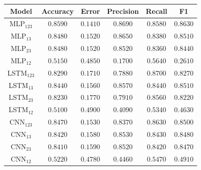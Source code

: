 \documentclass[a4paper,fleqn]{cas-sc}
\begin{document}
\begin{minipage}{0.45\textwidth}
	\vspace{0.5cm}
	\begingroup
	\begin{tiny}	
		\setlength{\tabcolsep}{3pt}
		\renewcommand{\arraystretch}{1.15}
		
		
		\begin{tabular*}{\textwidth}{@{} CCCCCC@{} }
			\toprule
			Model&Accuracy&Error&Precision&Recall&F1 \\
			\midrule
				MLP$_{123}$ & $0.8590$ & $0.1410$ & $0.8690$ & $0.8580$ & $0.8630$ \\
				MLP$_{13}$ & $0.8480$ & $0.1520$ & $0.8650$ & $0.8380$ & $0.8510$ \\
				MLP$_{23}$ & $0.8480$ & $0.1520$ & $0.8520$ & $0.8360$ & $0.8440$ \\
				MLP$_{12}$ & $0.5150$ & $0.4850$ & $0.1700$ & $0.5640$ & $0.2610$ \\
				LSTM$_{123}$ & $0.8290$ & $0.1710$ & $0.7880$ & $0.8700$ & $0.8270$ \\
				LSTM$_{13}$ & $0.8440$ & $0.1560$ & $0.8570$ & $0.8440$ & $0.8510$ \\
				LSTM$_{23}$ & $0.8230$ & $0.1770$ & $0.7910$ & $0.8560$ & $0.8220$ \\
				LSTM$_{12}$ & $0.5100$ & $0.4900$ & $0.4090$ & $0.5340$ & $0.4630$ \\
				CNN$_{123}$ & $0.8470$ & $0.1530$ & $0.8370$ & $0.8630$ & $0.8500$ \\
				CNN$_{13}$ & $0.8420$ & $0.1580$ & $0.8530$ & $0.8430$ & $0.8480$ \\
				CNN$_{23}$ & $0.8410$ & $0.1590$ & $0.8520$ & $0.8420$ & $0.8470$ \\
				CNN$_{12}$ & $0.5220$ & $0.4780$ & $0.4460$ & $0.5470$ & $0.4910$ \\
			\bottomrule
		\end{tabular*}
		\vspace{-0.3cm}
		\label{tab:metricas_1000Mbps_teste}
	\end{tiny}
	\endgroup	
\end{minipage}
\\
\\
\\
\begingroup
\captionsetup[figure]{font=tiny}
\hfill
\end{document}
